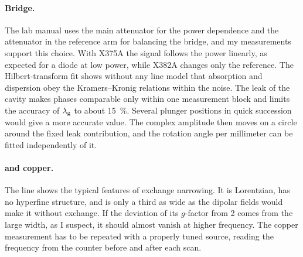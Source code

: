 \paragraph{Bridge.}
The lab manual uses the main attenuator for the power dependence and the attenuator in the reference arm for
balancing the bridge, and my measurements support this choice. With X375A the signal follows the power linearly, as
expected for a diode at low power, while X382A changes only the reference. The Hilbert-transform fit shows without any
line model that absorption and dispersion obey the Kramers--Kronig relations within the noise. The leak of
the cavity makes phases comparable only within one measurement block and limits the accuracy of $\lambda_\mathrm{g}$ to about
\qty{15}{\percent}. Several plunger positions in quick succession would give a more accurate value. The complex amplitude
then moves on a circle around the fixed leak contribution, and the rotation angle per millimeter can be fitted
independently of it.

\paragraph{\texorpdfstring{}{MnCl2} and copper.}
The  line shows the typical features of exchange narrowing. It is Lorentzian, has no hyperfine structure, and is
only a third as wide as the dipolar fields would make it without exchange. If the deviation of its $g$-factor from 2 comes
from the large width, as I suspect, it should almost vanish at higher frequency. The copper measurement has to be repeated
with a properly tuned source, reading the frequency from the counter before and after each scan.
